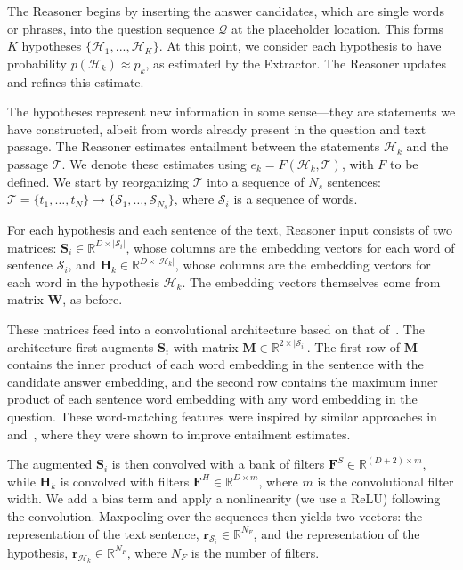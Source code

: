 \documentclass[11pt,letterpaper]{article}
\def\x{\times}
\def\S{\mathbf{S}}
\def\H{\mathbf{H}}
\begin{document}
The Reasoner begins by inserting the answer candidates, which are single words or phrases, into the question sequence $\mathcal{Q}$ at the placeholder location. This forms $K$ hypotheses $\{\mathcal{H}_1, ..., \mathcal{H}_K\}$. At this point, we consider each hypothesis to have probability $p(\mathcal{H}_k) \approx p_k$, as estimated by the Extractor. The Reasoner updates and refines this estimate.

The hypotheses represent new information in some sense---they are statements we have constructed, albeit from words already present in the question and text passage. The Reasoner estimates entailment between the statements $\mathcal{H}_k$ and the passage $\mathcal{T}$. We denote these estimates using $e_k = F(\mathcal{H}_k, \mathcal{T})$, with $F$ to be defined. We start by reorganizing $\mathcal{T}$ into a sequence of $N_s$ sentences: $\mathcal{T} = \{t_1, \ldots, t_N\} \rightarrow \{\mathcal{S}_1, \ldots, \mathcal{S}_{N_s}\}$, where $\mathcal{S}_i$ is a sequence of words.

For each hypothesis and each sentence of the text, Reasoner input consists of two matrices: $\S_i \in \mathbb{R}^{D \x |\mathcal{S}_i|}$, whose columns are the embedding vectors for each word of sentence $\mathcal{S}_i$, and $\H_k \in \mathbb{R}^{D \x |\mathcal{H}_k|}$, whose columns are the embedding vectors for each word in the hypothesis $\mathcal{H}_k$. The embedding vectors themselves come from matrix $\mathbf{W}$, as before.

These matrices feed into a convolutional architecture based on that of~. The architecture first augments $\S_i$ with matrix $\mathbf{M} \in \mathbb{R}^{2 \x |\mathcal{S}_i|}$. The first row of $\mathbf{M}$ contains the inner product of each word embedding in the sentence with the candidate answer embedding, and the second row contains the maximum inner product of each sentence word embedding with any word embedding in the question. These word-matching features were inspired by similar approaches in~ and~, where they were shown to improve entailment estimates.

The augmented $\S_i$ is then convolved with a bank of filters $\mathbf{F}^S \in \mathbb{R}^{(D+2) \x m}$, while $\H_k$ is convolved with filters $\mathbf{F}^H \in \mathbb{R}^{D \x m}$, where $m$ is the convolutional filter width. We add a bias term and apply a nonlinearity (we use a ReLU) following the convolution. Maxpooling over the sequences then yields two vectors: the representation of the text sentence, $\mathbf{r}_{\mathcal{S}_i} \in \mathbb{R}^{N_F}$, and the representation of the hypothesis, $\mathbf{r}_{\mathcal{H}_k} \in \mathbb{R}^{N_F}$, where $N_F$ is the number of filters.
\end{document}
